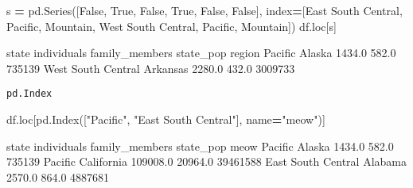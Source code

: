 \documentclass[
]{book}
\newenvironment{Shaded}{\begin{snugshade}}{\end{snugshade}}
\newcommand{\NormalTok}[1]{#1}
\newcommand{\OperatorTok}[1]{\textcolor[rgb]{0.81,0.36,0.00}{\textbf{#1}}}
\newcommand{\StringTok}[1]{\textcolor[rgb]{0.31,0.60,0.02}{#1}}
\newcommand{\VariableTok}[1]{\textcolor[rgb]{0.00,0.00,0.00}{#1}}
\begin{document}
\begin{Shaded}
\begin{Highlighting}[]
\NormalTok{s }\OperatorTok{=}\NormalTok{ pd.Series([}\VariableTok{False}\NormalTok{, }\VariableTok{True}\NormalTok{, }\VariableTok{False}\NormalTok{, }\VariableTok{True}\NormalTok{, }\VariableTok{False}\NormalTok{, }\VariableTok{False}\NormalTok{],}
\NormalTok{              index}\OperatorTok{=}\NormalTok{[}\StringTok{\textquotesingle{}East South Central\textquotesingle{}}\NormalTok{, }\StringTok{\textquotesingle{}Pacific\textquotesingle{}}\NormalTok{, }\StringTok{\textquotesingle{}Mountain\textquotesingle{}}\NormalTok{, }\StringTok{\textquotesingle{}West South Central\textquotesingle{}}\NormalTok{, }\StringTok{\textquotesingle{}Pacific\textquotesingle{}}\NormalTok{, }\StringTok{\textquotesingle{}Mountain\textquotesingle{}}\NormalTok{])}
\NormalTok{df.loc[s]}
\end{Highlighting}
\end{Shaded}

\begin{Shaded}
\begin{Highlighting}[]
\NormalTok{                       state  individuals  family\_members  state\_pop}
\NormalTok{region                                                              }
\NormalTok{Pacific               Alaska       1434.0           582.0     735139}
\NormalTok{West South Central  Arkansas       2280.0           432.0    3009733}
\end{Highlighting}
\end{Shaded}

\texttt{pd.Index}

\begin{Shaded}
\begin{Highlighting}[]
\NormalTok{df.loc[pd.Index([}\StringTok{"Pacific"}\NormalTok{, }\StringTok{"East South Central"}\NormalTok{], name}\OperatorTok{=}\StringTok{"meow"}\NormalTok{)]}
\end{Highlighting}
\end{Shaded}

\begin{Shaded}
\begin{Highlighting}[]
\NormalTok{                         state  individuals  family\_members  state\_pop}
\NormalTok{meow                                                                   }
\NormalTok{Pacific                 Alaska       1434.0           582.0     735139}
\NormalTok{Pacific             California     109008.0         20964.0   39461588}
\NormalTok{East South Central     Alabama       2570.0           864.0    4887681}
\end{Highlighting}
\end{Shaded}
\end{document}

